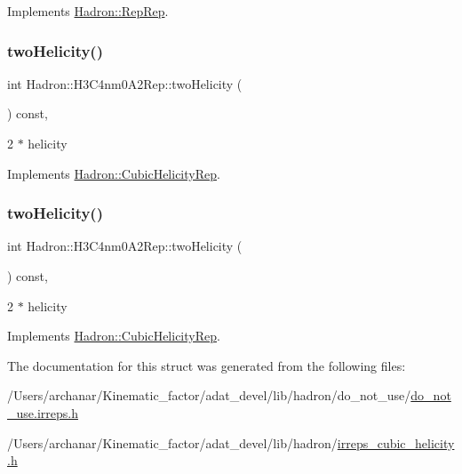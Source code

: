 Implements \mbox{\hyperlink{structHadron_1_1RepRep_ab3213025f6de249f7095892109575fde}{Hadron\+::\+Rep\+Rep}}.

\mbox{\label{structHadron_1_1H3C4nm0A2Rep_a84b0324c5ce0fc4024042887f259aa7d}} 
\subsubsection{\texorpdfstring{twoHelicity()}{twoHelicity()}\hspace{0.1cm}{\footnotesize\ttfamily [1/2]}}
{\footnotesize\ttfamily int Hadron\+::\+H3\+C4nm0\+A2\+Rep\+::two\+Helicity (\begin{DoxyParamCaption}{ }\end{DoxyParamCaption}) const\hspace{0.3cm}{\ttfamily [inline]}, {\ttfamily [virtual]}}

2 $\ast$ helicity 

Implements \mbox{\hyperlink{structHadron_1_1CubicHelicityRep_af507aa56fc2747eacc8cb6c96db31ecc}{Hadron\+::\+Cubic\+Helicity\+Rep}}.

\mbox{\label{structHadron_1_1H3C4nm0A2Rep_a84b0324c5ce0fc4024042887f259aa7d}} 
\subsubsection{\texorpdfstring{twoHelicity()}{twoHelicity()}\hspace{0.1cm}{\footnotesize\ttfamily [2/2]}}
{\footnotesize\ttfamily int Hadron\+::\+H3\+C4nm0\+A2\+Rep\+::two\+Helicity (\begin{DoxyParamCaption}{ }\end{DoxyParamCaption}) const\hspace{0.3cm}{\ttfamily [inline]}, {\ttfamily [virtual]}}

2 $\ast$ helicity 

Implements \mbox{\hyperlink{structHadron_1_1CubicHelicityRep_af507aa56fc2747eacc8cb6c96db31ecc}{Hadron\+::\+Cubic\+Helicity\+Rep}}.



The documentation for this struct was generated from the following files\+:\begin{DoxyCompactItemize}
\item 
/\+Users/archanar/\+Kinematic\+\_\+factor/adat\+\_\+devel/lib/hadron/do\+\_\+not\+\_\+use/\mbox{\hyperlink{do__not__use_8irreps_8h}{do\+\_\+not\+\_\+use.\+irreps.\+h}}\item 
/\+Users/archanar/\+Kinematic\+\_\+factor/adat\+\_\+devel/lib/hadron/\mbox{\hyperlink{lib_2hadron_2irreps__cubic__helicity_8h}{irreps\+\_\+cubic\+\_\+helicity.\+h}}\end{DoxyCompactItemize}
